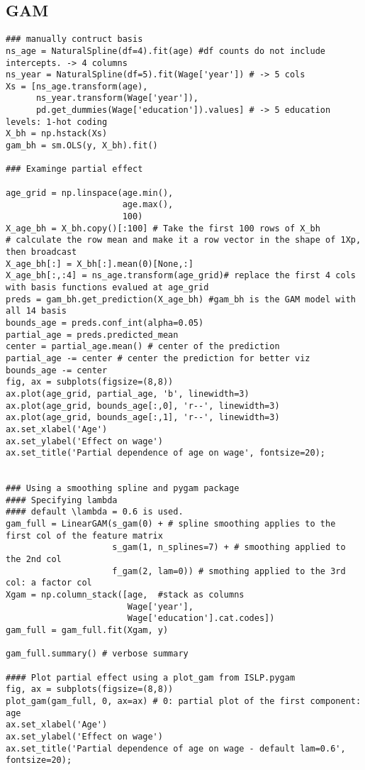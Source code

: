 \documentclass[
  letterpaper,
  DIV=11,
  numbers=noendperiod]{scrreprt}
\begin{document}
\subsection{GAM}\label{gam}

\begin{verbatim}
### manually contruct basis 
ns_age = NaturalSpline(df=4).fit(age) #df counts do not include intercepts. -> 4 columns
ns_year = NaturalSpline(df=5).fit(Wage['year']) # -> 5 cols
Xs = [ns_age.transform(age),
      ns_year.transform(Wage['year']),
      pd.get_dummies(Wage['education']).values] # -> 5 education levels: 1-hot coding
X_bh = np.hstack(Xs)
gam_bh = sm.OLS(y, X_bh).fit()

### Examinge partial effect

age_grid = np.linspace(age.min(),
                       age.max(),
                       100)
X_age_bh = X_bh.copy()[:100] # Take the first 100 rows of X_bh
# calculate the row mean and make it a row vector in the shape of 1Xp, then broadcast
X_age_bh[:] = X_bh[:].mean(0)[None,:] 
X_age_bh[:,:4] = ns_age.transform(age_grid)# replace the first 4 cols with basis functions evalued at age_grid
preds = gam_bh.get_prediction(X_age_bh) #gam_bh is the GAM model with all 14 basis
bounds_age = preds.conf_int(alpha=0.05)
partial_age = preds.predicted_mean
center = partial_age.mean() # center of the prediction 
partial_age -= center # center the prediction for better viz
bounds_age -= center
fig, ax = subplots(figsize=(8,8))
ax.plot(age_grid, partial_age, 'b', linewidth=3)
ax.plot(age_grid, bounds_age[:,0], 'r--', linewidth=3)
ax.plot(age_grid, bounds_age[:,1], 'r--', linewidth=3)
ax.set_xlabel('Age')
ax.set_ylabel('Effect on wage')
ax.set_title('Partial dependence of age on wage', fontsize=20);


### Using a smoothing spline and pygam package
#### Specifying lambda
#### default \lambda = 0.6 is used.
gam_full = LinearGAM(s_gam(0) + # spline smoothing applies to the first col of the feature matrix
                     s_gam(1, n_splines=7) + # smoothing applied to the 2nd col 
                     f_gam(2, lam=0)) # smothing applied to the 3rd col: a factor col
Xgam = np.column_stack([age,  #stack as columns
                        Wage['year'],
                        Wage['education'].cat.codes]) 
gam_full = gam_full.fit(Xgam, y)

gam_full.summary() # verbose summary

#### Plot partial effect using a plot_gam from ISLP.pygam
fig, ax = subplots(figsize=(8,8))
plot_gam(gam_full, 0, ax=ax) # 0: partial plot of the first component: age
ax.set_xlabel('Age')
ax.set_ylabel('Effect on wage')
ax.set_title('Partial dependence of age on wage - default lam=0.6', fontsize=20);


\end{verbatim}
\end{document}
